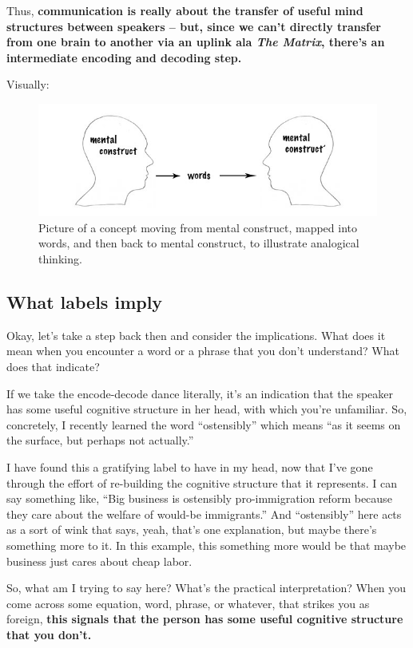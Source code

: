 Thus, \textbf{communication is really about the transfer of useful mind
structures between speakers -- but, since we can't directly transfer
from one brain to another via an uplink ala \emph{The Matrix}, there's
an intermediate encoding and decoding step.}

Visually:

\begin{figure}[htbp]
\centering
\includegraphics[width=\textwidth]{graphics/analogical-thinking.jpg}
\caption{Picture of a concept moving from mental construct, mapped into
words, and then back to mental construct, to illustrate analogical
thinking.}
\end{figure}

\subsection{What labels imply}\label{what-labels-imply}

Okay, let's take a step back then and consider the implications. What
does it mean when you encounter a word or a phrase that you don't
understand? What does that indicate?

If we take the encode-decode dance literally, it's an indication that
the speaker has some useful cognitive structure in her head, with which
you're unfamiliar. So, concretely, I recently learned the word
``ostensibly'' which means ``as it seems on the surface, but perhaps not
actually.''

I have found this a gratifying label to have in my head, now that I've
gone through the effort of re-building the cognitive structure that it
represents. I can say something like, ``Big business is ostensibly
pro-immigration reform because they care about the welfare of would-be
immigrants.'' And ``ostensibly'' here acts as a sort of wink that says,
yeah, that's one explanation, but maybe there's something more to it. In
this example, this something more would be that maybe business just
cares about cheap labor.

So, what am I trying to say here? What's the practical interpretation?
When you come across some equation, word, phrase, or whatever, that
strikes you as foreign, \textbf{this signals that the person has some
useful cognitive structure that you don't.}

